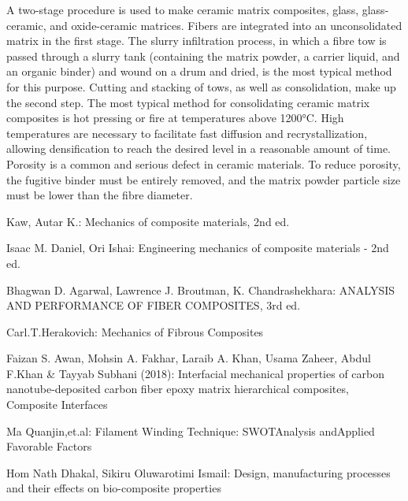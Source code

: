 \documentclass{article}
\begin{document}
\begin{multicols}{2}
A two-stage procedure is used to make ceramic matrix composites, glass, glass-ceramic, and oxide-ceramic matrices. Fibers are integrated into an unconsolidated matrix in the first stage. The slurry infiltration process, in which a fibre tow is passed through a slurry tank (containing the matrix powder, a carrier liquid, and an organic binder) and wound on a drum and dried, is the most typical method for this purpose. Cutting and stacking of tows, as well as consolidation, make up the second step. The most typical method for consolidating ceramic matrix composites is hot pressing or fire at temperatures above 1200°C. High temperatures are necessary to facilitate fast diffusion and recrystallization, allowing densification to reach the desired level in a reasonable amount of time. Porosity is a common and serious defect in ceramic materials. To reduce porosity, the fugitive binder must be entirely removed, and the matrix powder particle size must be lower than the fibre diameter.

\begin{thebibliography}{9}
Kaw, Autar K.: Mechanics of composite materials, 2nd ed.

Isaac M. Daniel, Ori Ishai: Engineering mechanics of composite materials - 2nd ed.

Bhagwan D. Agarwal, Lawrence J. Broutman, K. Chandrashekhara: ANALYSIS AND PERFORMANCE OF 
FIBER COMPOSITES, 3rd ed.

Carl.T.Herakovich: Mechanics of Fibrous Composites

Faizan S. Awan, Mohsin A. Fakhar, Laraib A. Khan, Usama Zaheer, Abdul F.Khan \& Tayyab Subhani (2018): Interfacial mechanical properties of carbon nanotube-deposited carbon fiber epoxy matrix hierarchical composites, Composite Interfaces

Ma Quanjin,et.al: Filament Winding Technique: SWOTAnalysis andApplied Favorable Factors

Hom Nath Dhakal, Sikiru Oluwarotimi Ismail: Design, manufacturing processes and their effects on bio-composite properties

\end{thebibliography}

\end{multicols}
\end{document}
